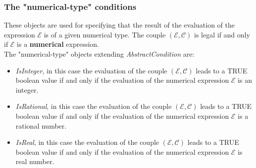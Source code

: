 \documentclass[a4paper,11pt] {article}
\begin{document}
\subsubsection{The "numerical-type" conditions}
These objects are used for specifying that the result of the evaluation of the expression $\mathcal E$ is of a given numerical type. The couple $(\mathcal E, \mathcal C)$ is legal if and only if $\mathcal E$ is a {\bf numerical} expression. \\
The "numerical-type" objects extending {\it AbstractCondition}  are:
\begin{itemize}
\item {\it IsInteger}, in this case the evaluation of the couple $(\mathcal E, \mathcal C)$ leads to a TRUE boolean value
if and only if the evaluation of the numerical expression $\mathcal E$ is an integer.
\item {\it IsRational}, in this case the evaluation of the couple $(\mathcal E, \mathcal C)$ leads to a TRUE boolean value if and only if the evaluation of the numerical expression $\mathcal E$ is a rational number.
\item {\it IsReal}, in this case the evaluation of the couple $(\mathcal E, \mathcal C)$ leads to a TRUE boolean value
if and only if the evaluation of the numerical expression $\mathcal E$ is real number.
\end{itemize} 
\end{document}
